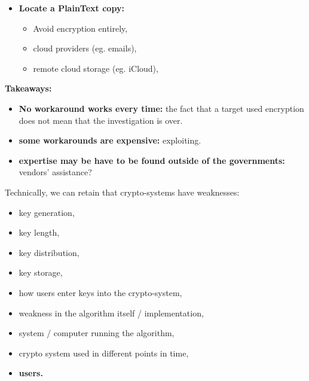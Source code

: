 \documentclass{beamer}
\begin{document}
\begin{frame}[allowframebreaks]
\begin{itemize}
\begin{itemize}
\pagebreak 

          \item {\bf Locate a PlainText copy:}

            \begin{itemize}
              \item Avoid encryption entirely,
              \item cloud providers (eg. emails),
              \item remote cloud storage (eg. iCloud),
            \end{itemize}
 
        \end{itemize}

       \end{itemize}

      \vspace{5mm}

       {\bf Takeaways:}
       \begin{itemize}
        \item {\bf No workaround works every time:}  the fact that a target used
          encryption does not mean that the investigation is over.
        \item {\bf some workarounds are expensive:} exploiting.
        \item {\bf expertise may be have to be found outside of the
            governments:} vendors' assistance?
       \end{itemize}

 
        \framebreak

      Technically, we can retain that crypto-systems have weaknesses:

      \begin{itemize}
        \item key generation,
        \item key length,
        \item key distribution,
        \item key storage,
        \item how users enter keys into the crypto-system,
        \item weakness in the algorithm itself / implementation,
        \item system / computer running the algorithm,
        \item crypto system used in different points in time,
        \item {\bf users.}
      \end{itemize}

       
\end{frame}
\end{document}
